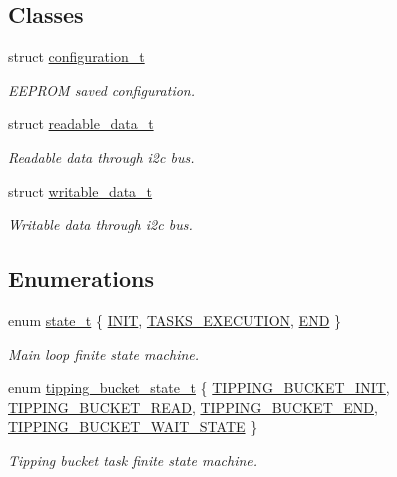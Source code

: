 \subsection*{Classes}
\begin{DoxyCompactItemize}
\item 
struct \hyperlink{structconfiguration__t}{configuration\+\_\+t}
\begin{DoxyCompactList}\small\item\em E\+E\+P\+R\+OM saved configuration. \end{DoxyCompactList}\item 
struct \hyperlink{structreadable__data__t}{readable\+\_\+data\+\_\+t}
\begin{DoxyCompactList}\small\item\em Readable data through i2c bus. \end{DoxyCompactList}\item 
struct \hyperlink{structwritable__data__t}{writable\+\_\+data\+\_\+t}
\begin{DoxyCompactList}\small\item\em Writable data through i2c bus. \end{DoxyCompactList}\end{DoxyCompactItemize}
\subsection*{Enumerations}
\begin{DoxyCompactItemize}
\item 
enum \hyperlink{i2c-rain_8h_aa0aafed44fec19806d8f9ad834be1248}{state\+\_\+t} \{ \hyperlink{i2c-rain_8h_aa0aafed44fec19806d8f9ad834be1248a0cb1b2c6a7db1f1084886c98909a3f36}{I\+N\+IT}, 
\hyperlink{i2c-rain_8h_aa0aafed44fec19806d8f9ad834be1248a34f1df650a5075369a6827770c433a91}{T\+A\+S\+K\+S\+\_\+\+E\+X\+E\+C\+U\+T\+I\+ON}, 
\hyperlink{i2c-rain_8h_aa0aafed44fec19806d8f9ad834be1248adc6f24fd6915a3f2786a1b7045406924}{E\+ND}
 \}\begin{DoxyCompactList}\small\item\em Main loop finite state machine. \end{DoxyCompactList}
\item 
enum \hyperlink{i2c-rain_8h_a7935f2f599e6a870190d4ae0a86205ba}{tipping\+\_\+bucket\+\_\+state\+\_\+t} \{ \hyperlink{i2c-rain_8h_a7935f2f599e6a870190d4ae0a86205baa0b7c7807059f943bc642578373d65287}{T\+I\+P\+P\+I\+N\+G\+\_\+\+B\+U\+C\+K\+E\+T\+\_\+\+I\+N\+IT}, 
\hyperlink{i2c-rain_8h_a7935f2f599e6a870190d4ae0a86205baa292adccffc71f51ae82f4e219a03e341}{T\+I\+P\+P\+I\+N\+G\+\_\+\+B\+U\+C\+K\+E\+T\+\_\+\+R\+E\+AD}, 
\hyperlink{i2c-rain_8h_a7935f2f599e6a870190d4ae0a86205baa27bb1d47c1289d872321404357c8d2e7}{T\+I\+P\+P\+I\+N\+G\+\_\+\+B\+U\+C\+K\+E\+T\+\_\+\+E\+ND}, 
\hyperlink{i2c-rain_8h_a7935f2f599e6a870190d4ae0a86205baa563187c281a3c4faf3684472339c78c1}{T\+I\+P\+P\+I\+N\+G\+\_\+\+B\+U\+C\+K\+E\+T\+\_\+\+W\+A\+I\+T\+\_\+\+S\+T\+A\+TE}
 \}\begin{DoxyCompactList}\small\item\em Tipping bucket task finite state machine. \end{DoxyCompactList}
\end{DoxyCompactItemize}
